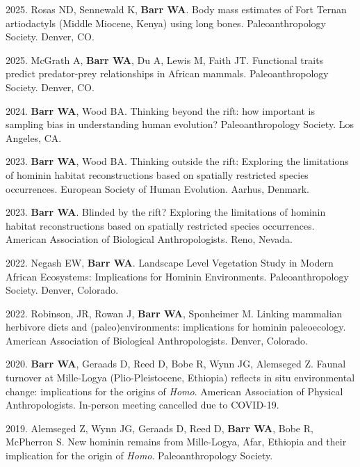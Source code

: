 \documentclass{article}
\begin{document}
\begin{etaremune}
\item 2025.  Rosas ND, Sennewald K, {\bfseries Barr WA}. Body mass estimates of Fort Ternan artiodactyls (Middle Miocene, Kenya) using long bones. Paleoanthropology Society.  Denver, CO.

\item 2025.  McGrath A, {\bfseries Barr WA},  Du A, Lewis M, Faith JT. Functional traits predict predator-prey relationships in African mammals. Paleoanthropology Society.  Denver, CO.



\item 2024. {\bfseries Barr WA}, Wood BA. Thinking beyond the rift: how important is sampling bias in understanding human evolution? Paleoanthropology Society. Los Angeles, CA. 

\item 2023. {\bfseries Barr WA}, Wood BA. Thinking outside the rift: Exploring the limitations of hominin habitat reconstructions based on spatially restricted species occurrences. European Society of Human Evolution.  Aarhus, Denmark. 

\item 2023. {\bfseries Barr WA}. Blinded by the rift? Exploring the limitations of hominin habitat reconstructions based on spatially restricted species occurrences. American Association of Biological Anthropologists.  Reno, Nevada.


\item 2022. Negash EW, {\bfseries Barr WA}. Landscape Level Vegetation Study in Modern African Ecosystems: Implications for Hominin Environments. Paleoanthropology Society. Denver, Colorado. 

 \item 2022. Robinson, JR, Rowan J, {\bfseries Barr WA}, Sponheimer M. Linking mammalian herbivore diets and (paleo)environments: implications for hominin paleoecology. American Association of Biological Anthropologists. Denver, Colorado. 


\item 2020. {\bfseries Barr WA}, Geraads D, Reed D, Bobe R, Wynn JG, Alemseged Z. Faunal turnover at Mille-Logya (Plio-Pleistocene, Ethiopia) reflects in situ environmental change: implications for the origins of \emph{Homo}. American Association of Physical Anthropologists. In-person meeting cancelled due to COVID-19.


\item 2019. Alemseged Z, Wynn JG, Geraads D, Reed D, {\bfseries Barr WA}, Bobe R, McPherron S. New hominin remains from Mille-Logya, Afar, Ethiopia and their implication for the origin of \emph{Homo}. Paleoanthropology Society.


\end{etaremune}
\end{document}
